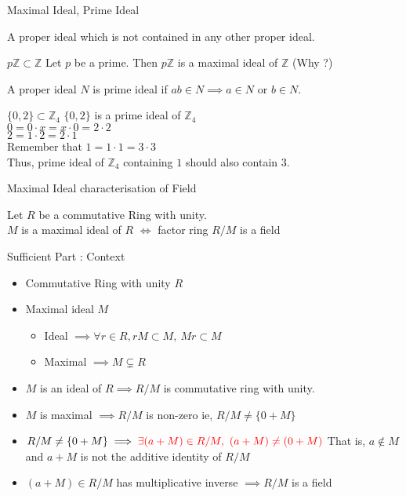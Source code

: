\documentclass{beamer}
\begin{document}
\begin{frame}{Maximal Ideal, Prime Ideal}
\begin{definition}
	A proper ideal which is not contained in any other proper ideal.
\end{definition}
\begin{exampleblock}{$p\mathbb{Z} \subset \mathbb{Z}$}
	Let $p$ be a prime. Then $p\mathbb{Z}$ is a maximal ideal of $\mathbb{Z}$ (Why ?)
\end{exampleblock}
\begin{definition}
	A proper  ideal $N$ is prime ideal if $ab \in N \implies a \in N \text{ or } b \in N$.
\end{definition}
\begin{exampleblock}{$\{ 0,2 \} \subset \mathbb{Z}_4$}
$\{ 0,2 \}$ is a prime ideal of $\mathbb{Z}_4$ \\
$ 0 = 0 \cdot x = x \cdot 0 = 2 \cdot 2$\\
$ 2 = 1 \cdot 2 = 2 \cdot 1$ \\
Remember that $1 = 1 \cdot 1 = 3 \cdot 3$\\
Thus, prime ideal of $\mathbb{Z}_4$ containing $1$ should also contain $3$.
\end{exampleblock}
\end{frame}

\begin{frame}{Maximal Ideal characterisation of Field}
\begin{theorem}
	Let $R$ be a commutative Ring with unity.\\
	$M$ is a maximal ideal of $R$ $\iff$ factor ring $R/M$ is a field
\end{theorem}
\begin{block}{Sufficient Part : Context}
\begin{itemize}
	\item Commutative Ring with unity $R$
	\item Maximal ideal $M$
	\begin{itemize}
		\item Ideal $\implies \forall r \in R, rM \subset M,\ Mr \subset M$
		\item Maximal $\implies M \subsetneq R$
	\end{itemize}
	\item $M$ is an ideal of $R \implies R/M$ is commutative ring with unity.
	\item $M$ is maximal  $\implies R/M$ is non-zero ie, $R/M \ne \{ 0+M \}$
	\item $R/M \ne \{ 0+M \} \implies {\color{red} \exists (a + M) \in R/M,\ (a+M) \ne (0+M)}$ That is, $a \notin M$ and  $a+M$ is not the additive identity of $R/M$
	\item $(a+M) \in R/M$ has multiplicative inverse $\implies R/M$ is a field
\end{itemize}
\end{block}
\end{frame}
\end{document}
